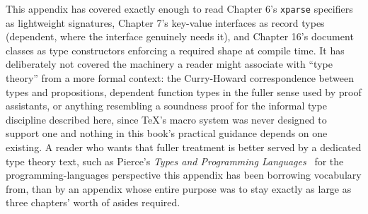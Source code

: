 This appendix has covered exactly enough to read Chapter 6's \texttt{xparse} specifiers as lightweight signatures, Chapter 7's key-value interfaces as record types (dependent, where the interface genuinely needs it), and Chapter 16's document classes as type constructors enforcing a required shape at compile time. It has deliberately not covered the machinery a reader might associate with ``type theory'' from a more formal context: the Curry-Howard correspondence between types and propositions, dependent function types in the fuller sense used by proof assistants, or anything resembling a soundness proof for the informal type discipline described here, since TeX's macro system was never designed to support one and nothing in this book's practical guidance depends on one existing. A reader who wants that fuller treatment is better served by a dedicated type theory text, such as Pierce's \emph{Types and Programming Languages}~\cite{pierce2002types} for the programming-languages perspective this appendix has been borrowing vocabulary from, than by an appendix whose entire purpose was to stay exactly as large as three chapters' worth of asides required.

